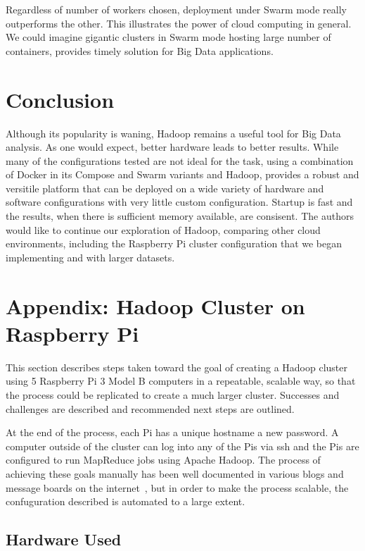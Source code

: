 Regardless of number of workers chosen, deployment under Swarm mode
really outperforms the other. This illustrates the power of cloud
computing in general. We could imagine gigantic clusters in Swarm mode
hosting large number of containers, provides timely solution for Big
Data applications.


\section{Conclusion}\label{s:conclusion}

Although its popularity is waning, Hadoop remains a useful tool for
Big Data analysis. As one would expect, better hardware leads to
better results.  While many of the configurations tested are not ideal
for the task, using a combination of Docker in its Compose and Swarm
variants and Hadoop, provides a robust and versitile platform that can
be deployed on a wide variety of hardware and software configurations
with very little custom configuration. Startup is fast and the
results, when there is sufficient memory available, are consisent. The
authors would like to continue our exploration of Hadoop, comparing
other cloud environments, including the Raspberry Pi cluster
configuration that we began implementing and with larger datasets. 

\section{Appendix: Hadoop Cluster on Raspberry Pi}\label{s:appendix}
This section describes steps taken toward the goal of creating a
Hadoop cluster using 5 Raspberry Pi 3 Model B computers in a
repeatable, scalable way, so that the process could be replicated to
create a much larger cluster. Successes and challenges are described
and recommended next steps are outlined.

At the end of the process, each Pi has a unique hostname a new
password. A computer outside of the cluster can log into any of the
Pis via ssh and the Pis are configured to run MapReduce jobs using
Apache Hadoop. The process of achieving these goals manually has been
well documented in various blogs and message boards on the
internet~\cite{hid-sp18-419-headless}, but in order to make the
process scalable, the confuguration described is automated to a large
extent.

\subsection{Hardware Used}

